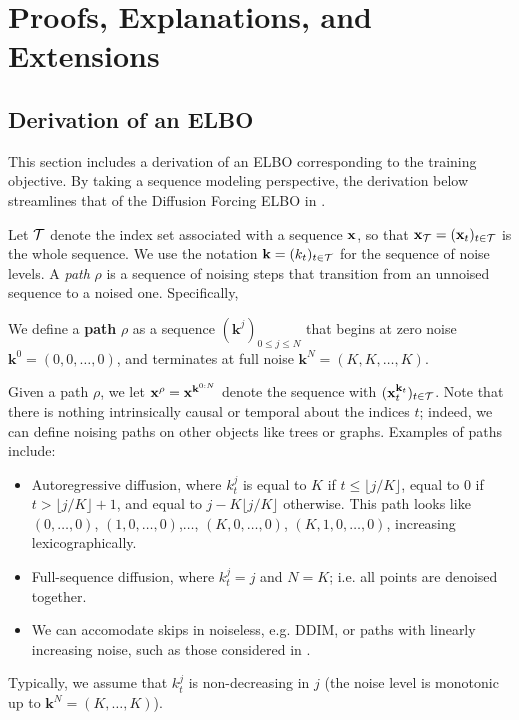 
\section{Proofs, Explanations, and Extensions}
\subsection{Derivation of an ELBO}
\label{appendix:theory_elbo}
\newcommand\numberthis{\addtocounter{equation}{1}\tag{\theequation}}
\newcommand{\floor}[1]{\lfloor#1\rfloor}

\newcommand{\veck}{\mathbf{k}}
\newcommand{\bbK}{\mathbb{K}}
\newcommand{\ptheta}{p_{\bm{\theta}}}
\newcommand{\bk}{\mathbf{k}}

This section includes a derivation of an ELBO corresponding to the \mtd{} training objective. By taking a sequence modeling perspective, the derivation below streamlines that of the Diffusion Forcing ELBO in \cite{chen2024diffusion}.

Let ${\mathcal{T}}$ denote the index set associated with a  sequence ${\mathbf{x}}$, so that ${\mathbf{x}}_{{\mathcal{T}}} = ({\mathbf{x}}_t)_{t \in {\mathcal{T}}}$ is the whole sequence. We use the notation $\bk =(k_t)_{t \in \cT}$ for the sequence of noise levels. A \emph{path} $\rho$ is a sequence of noising steps that transition from an unnoised sequence to a noised one. Specifically,
\begin{definition}[Path] We define a \textbf{path} $\rho$ as a sequence $(\bk^j)_{0   \le j \le N}$ that begins at zero noise $\bk^0 = (0,0,\dots,0)$, and terminates at full noise $\bk^N = (K, K,\dots, K)$.
\end{definition}
Given a path $\rho$, we let $\bx^{\rho} = \bx^{\bk^{0:N}}$ denote the sequence with $(\bx_t^{\bk_t})_{t \in \cT}$. Note that there is nothing intrinsically causal or temporal about the indices $t$; indeed, we can define noising paths on other objects like trees or graphs. Examples of paths include:
\begin{itemize}
    \item Autoregressive diffusion, where $k^{j}_t$ is equal to $K$ if $t \le \floor{j/K}$, equal to $0$ if $t > \floor{j/K} + 1$, and equal to $j - K\floor{j/K}$ otherwise. This path looks like $(0,\dots,0)$, $(1,0,\dots,0)$,$\dots$, $(K,0,\dots,0)$, $(K,1,0,\dots,0)$, increasing lexicographically.
    \item Full-sequence diffusion, where $k^j_t = j$ and $N = K$; i.e. all points are denoised together. 
    \item We can accomodate skips in noiseless, e.g. DDIM, or paths with linearly increasing noise, such as those considered in \cite{chen2024diffusion}. 
\end{itemize}
Typically, we assume that $k^j_t$ is non-decreasing in $j$ (the noise level is monotonic up to $\bk^N = (K,\dots,K)$).

